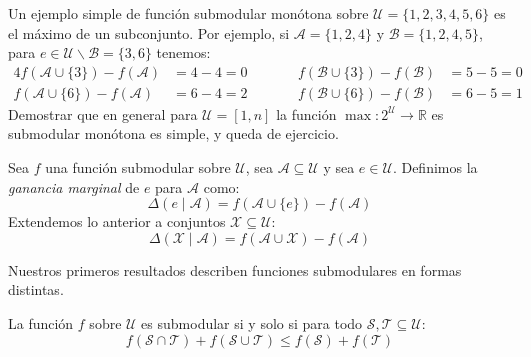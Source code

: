   Un ejemplo simple de función submodular monótona
  sobre \(\mathscr{U} = \{1, 2, 3, 4, 5, 6\}\) es el máximo de un subconjunto.
  Por ejemplo,
  si \(\mathscr{A} = \{1, 2, 4\}\) y \(\mathscr{B} = \{1, 2, 4, 5\}\),
  para \(e \in \mathscr{U} \smallsetminus \mathscr{B} = \{3, 6\}\) tenemos:
  \begin{alignat*}{4}
    f(\mathscr{A} \cup \{3\}) - f(\mathscr{A})
      &= 4 - 4 = 0
      &\qquad&
      f(\mathscr{B} \cup \{3\}) - f(\mathscr{B})
      &= 5 - 5 = 0 \\
    f(\mathscr{A} \cup \{6\}) - f(\mathscr{A})
      &= 6 - 4 = 2
      &\qquad&
      f(\mathscr{B} \cup \{6\}) - f(\mathscr{B})
      &= 6 - 5 = 1
  \end{alignat*}
  Demostrar que en general para \(\mathscr{U} = [1, n]\) la función
  \(\max \colon 2^{\mathscr{U}} \to \mathbb{R}\) es submodular monótona
  es simple,
  y queda de ejercicio.
  \begin{definition}
    \label{def:marginal-utility}
    Sea \(f\) una función submodular sobre \(\mathscr{U}\),
    sea \(\mathscr{A} \subseteq \mathscr{U}\)
    y sea \(e \in \mathscr{U}\).
    Definimos la \emph{ganancia marginal} de \(e\) para \(\mathscr{A}\)
    como:
    \begin{equation*}
      \Delta(e \mid \mathscr{A})
        = f(\mathscr{A} \cup \{e\}) - f(\mathscr{A})
    \end{equation*}
    Extendemos lo anterior a conjuntos \(\mathscr{X} \subseteq \mathscr{U}\):
    \begin{equation*}
      \Delta(\mathscr{X} \mid \mathscr{A})
        = f(\mathscr{A} \cup \mathscr{X}) - f(\mathscr{A})
    \end{equation*}
  \end{definition}
  Nuestros primeros resultados describen funciones submodulares
  en formas distintas.
  \begin{theorem}
    \label{theo:submodular-intersection-union}
    La función \(f\) sobre \(\mathscr{U}\) es submodular
    si y solo si para todo \(\mathscr{S}, \mathscr{T} \subseteq \mathscr{U}\):
    \begin{equation}
      \label{eq:submodular-intersection-union}
      f(\mathscr{S} \cap \mathscr{T}) + f(\mathscr{S} \cup \mathscr{T})
       \le f(\mathscr{S}) + f(\mathscr{T})
    \end{equation}
  \end{theorem}
